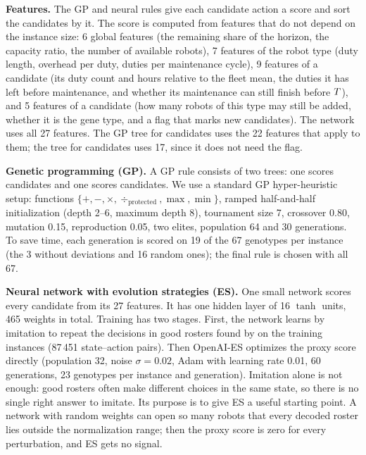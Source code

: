 \documentclass[journal]{IEEEtran}
\begin{document}
\textbf{Features.}
The GP and neural rules give each candidate action a score and sort the candidates by it.
The score is computed from features that do not depend on the instance size:
6 global features (\eg the remaining share of the horizon, the capacity ratio, the number of available robots),
7 features of the robot type (\eg duty length, overhead per duty, duties per maintenance cycle),
9 features of a \reuse candidate (\eg its duty count and hours relative to the fleet mean, the duties it has left before maintenance, and whether its maintenance can still finish before $T$),
and 5 features of a \new candidate (\eg how many robots of this type may still be added, whether it is the gene type, and a flag that marks new candidates).
The network uses all 27 features.
The GP tree for \reuse candidates uses the 22 features that apply to them; the tree for \new candidates uses 17, since it does not need the flag.

\textbf{Genetic programming (GP).}
A GP rule consists of two trees: one scores \reuse candidates and one scores \new candidates.
We use a standard GP hyper-heuristic setup:
functions $\{+, -, \times, \div_{\text{protected}}, \max, \min\}$,
ramped half-and-half initialization (depth 2--6, maximum depth 8),
tournament size 7, crossover 0.80, mutation 0.15, reproduction 0.05, two elites,
population 64 and 30 generations.
To save time, each generation is scored on 19 of the 67 genotypes per instance (the 3 without deviations and 16 random ones);
the final rule is chosen with all 67.

\textbf{Neural network with evolution strategies (ES).}
One small network scores every candidate from its 27 features.
It has one hidden layer of 16 $\tanh$ units, 465 weights in total.
Training has two stages.
First, the network learns by imitation to repeat the decisions in good rosters found by  on the training instances (87\,451 state--action pairs).
Then OpenAI-ES \cite{salimans2017evolution} optimizes the proxy score directly
(population 32, noise $\sigma = 0.02$, Adam \cite{kingma2015adam} with learning rate 0.01, 60 generations, 23 genotypes per instance and generation).
Imitation alone is not enough: good rosters often make different choices in the same state, so there is no single right answer to imitate.
Its purpose is to give ES a useful starting point.
A network with random weights can open so many robots that every decoded roster lies outside the normalization range;
then the proxy score is zero for every perturbation, and ES gets no signal.
\end{document}
